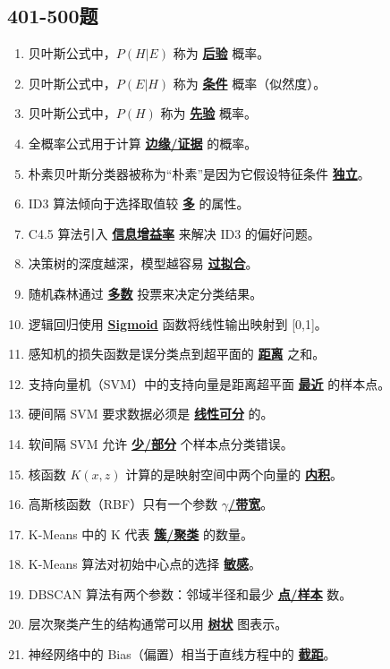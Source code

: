 \documentclass[12pt,a4paper,openany]{ctexbook}
\begin{document}
\subsection{401-500题}
\begin{enumerate}[resume,leftmargin=2em,itemsep=1pt]
\item 贝叶斯公式中，$P(H|E)$ 称为 \underline{\textbf{后验}} 概率。
\item 贝叶斯公式中，$P(E|H)$ 称为 \underline{\textbf{条件}} 概率（似然度）。
\item 贝叶斯公式中，$P(H)$ 称为 \underline{\textbf{先验}} 概率。
\item 全概率公式用于计算 \underline{\textbf{边缘/证据}} 的概率。
\item 朴素贝叶斯分类器被称为“朴素”是因为它假设特征条件 \underline{\textbf{独立}}。
\item ID3 算法倾向于选择取值较 \underline{\textbf{多}} 的属性。
\item C4.5 算法引入 \underline{\textbf{信息增益率}} 来解决 ID3 的偏好问题。
\item 决策树的深度越深，模型越容易 \underline{\textbf{过拟合}}。
\item 随机森林通过 \underline{\textbf{多数}} 投票来决定分类结果。
\item 逻辑回归使用 \underline{\textbf{Sigmoid}} 函数将线性输出映射到 [0,1]。
\item 感知机的损失函数是误分类点到超平面的 \underline{\textbf{距离}} 之和。
\item 支持向量机（SVM）中的支持向量是距离超平面 \underline{\textbf{最近}} 的样本点。
\item 硬间隔 SVM 要求数据必须是 \underline{\textbf{线性可分}} 的。
\item 软间隔 SVM 允许 \underline{\textbf{少/部分}} 个样本点分类错误。
\item 核函数 $K(x, z)$ 计算的是映射空间中两个向量的 \underline{\textbf{内积}}。
\item 高斯核函数（RBF）只有一个参数 \underline{\textbf{$\gamma$/带宽}}。
\item K-Means 中的 K 代表 \underline{\textbf{簇/聚类}} 的数量。
\item K-Means 算法对初始中心点的选择 \underline{\textbf{敏感}}。
\item DBSCAN 算法有两个参数：邻域半径和最少 \underline{\textbf{点/样本}} 数。
\item 层次聚类产生的结构通常可以用 \underline{\textbf{树状}} 图表示。
\item 神经网络中的 Bias（偏置）相当于直线方程中的 \underline{\textbf{截距}}。

\end{enumerate}
\end{document}
